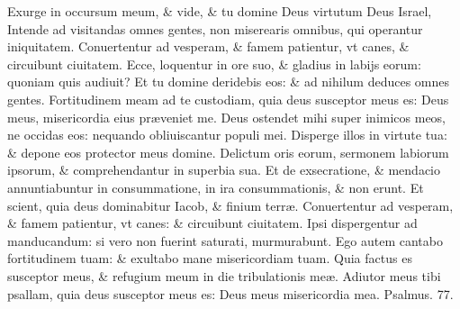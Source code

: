 \documentclass[a5paper,10pt]{book}
\def\ae{æ}
\begin{document}
\begin{multicols*}{2}
\newline \color{red} E\color{black}xurge in occursum meum, \& vide, \& tu domine Deus virtutum Deus Israel,
\newline \color{red} I\color{black}ntende ad visitandas omnes gentes, non miserearis omnibus, qui operantur iniquitatem.
\newline \color{red} C\color{black}onuertentur ad vesperam, \& famem patientur, vt canes, \& circuibunt ciuitatem.
\newline \color{red} E\color{black}cce, loquentur in ore suo, \& gladius in labijs eorum: quoniam quis audiuit?
\newline \color{red} E\color{black}t tu domine deridebis eos: \& ad nihilum deduces omnes gentes.%
\newline \color{red} F\color{black}ortitudinem meam ad te custodiam, quia deus susceptor meus es: Deus meus, misericordia eius pr\ae veniet me.
\newline \color{red} D\color{black}eus ostendet mihi super inimicos meos, ne occidas eos: nequando obliuiscantur populi mei.
\newline \color{red} D\color{black}isperge illos in virtute tua: \& depone eos protector meus domine.
\newline \color{red} D\color{black}elictum oris eorum, sermonem labiorum ipsorum, \& comprehendantur in superbia sua.
\newline \color{red} E\color{black}t de exsecratione, \& mendacio annuntiabuntur in consummatione, in ira consummationis, \& non erunt.
\newline \color{red} E\color{black}t scient, quia deus dominabitur Iacob, \& finium terr\ae .
\newline \color{red} C\color{black}onuertentur ad vesperam, \& famem patientur, vt canes: \& circuibunt ciuitatem.
\newline \color{red} I\color{black}psi dispergentur ad manducandum: si vero non fuerint saturati, murmurabunt.%
\newline \color{red} E\color{black}go autem cantabo fortitudinem tuam: \& exultabo mane misericordiam tuam.
\newline \color{red} Q\color{black}uia factus es susceptor meus, \& refugium meum in die tribulationis me\ae .
\newline \color{red} A\color{black}diutor meus tibi psallam, quia deus susceptor meus es: Deus meus misericordia mea. \quad \color{red} Psalmus. \hypertarget{ps77}{77.} \color{black}
\vspace{-.5em}

\end{multicols*}
\end{document}
